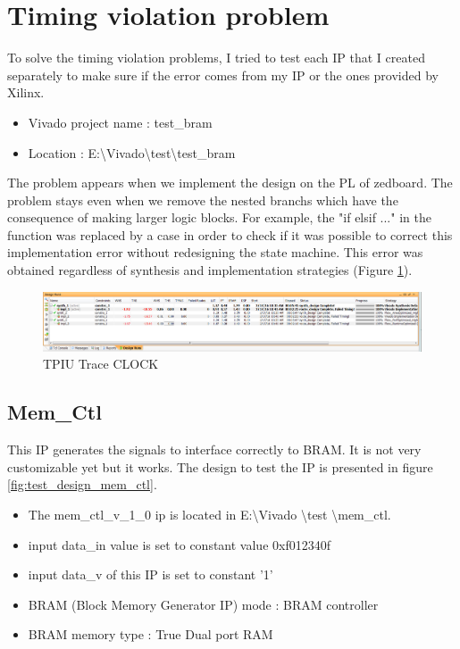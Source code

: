 \documentclass[10pt,a4paper, oneside]{memoir}
\begin{document}

\section{Timing violation problem}
To solve the timing violation problems, I tried to test each IP that I created separately to make sure if the error comes from my IP or the ones provided by Xilinx. 

\begin{itemize}
\item Vivado project name : test\_bram
\item Location : E:\textbackslash Vivado\textbackslash test\textbackslash test\_bram
\end{itemize}

The problem appears when we implement the design on the PL of zedboard. The problem stays even when we remove the nested branchs which have the consequence of making larger logic blocks. For example, the "if elsif ..." in the function was replaced by a case in order to check if it was possible to correct this implementation error without redesigning the state machine. This error was obtained regardless of synthesis and implementation strategies (Figure \ref{fig:tpiu_traces_design_runs}). 

\begin{figure}
\centering
\includegraphics[scale=.5, keepaspectratio]{images/pft_decoder_timing_design_runs}
\caption{TPIU Trace CLOCK}
\label{fig:tpiu_traces_design_runs}
\end{figure}


\subsection{Mem\_Ctl}
This IP generates the signals to interface correctly to BRAM. It is not very customizable yet but it works. The design to test the IP is presented in figure \ref{fig:test_design_mem_ctl}.

\begin{itemize}
\item The mem\_ctl\_v\_1\_0 ip is located in E:\textbackslash Vivado \textbackslash test \textbackslash mem\_ctl. 
\item input data\_in value is set to constant value 0xf012340f
\item input data\_v of this IP is set to constant '1'
\item BRAM (Block Memory Generator IP) mode : BRAM controller 
\item BRAM memory type : True Dual port RAM
\end{itemize}
\end{document}
